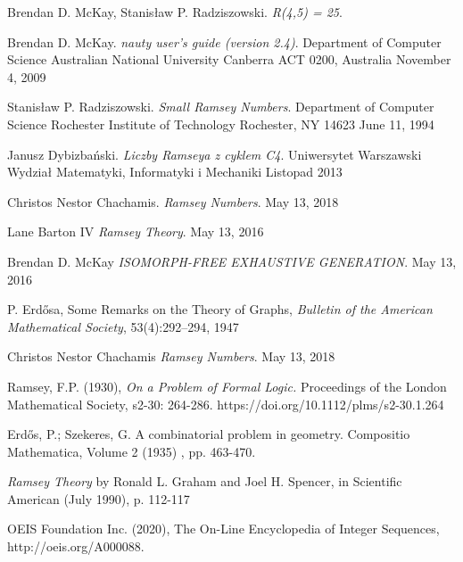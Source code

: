\documentclass[11pt]{article}
\begin{document}
\begin{thebibliography}{9}
  Brendan D. McKay, Stanisław P. Radziszowski. 
  \textit{R(4,5) = 25}. 
  
  Brendan D. McKay.
  \textit{nauty user's guide (version 2.4)}.  
  Department of Computer Science
  Australian National University
  Canberra ACT 0200, Australia
  November 4, 2009

  Stanisław P. Radziszowski.
  \textit{Small Ramsey Numbers}.  
  Department of Computer Science Rochester Institute of Technology Rochester, NY 14623
  June 11, 1994

  Janusz Dybizbański.
  \textit{Liczby Ramseya z cyklem C4}.  
  Uniwersytet Warszawski
  Wydział Matematyki, Informatyki i Mechaniki
  Listopad 2013

  Christos Nestor Chachamis.
  \textit{Ramsey Numbers}.  
  May 13, 2018

  Lane Barton IV
  \textit{Ramsey Theory}.  
  May 13, 2016

  Brendan D. McKay
  \textit{ISOMORPH-FREE EXHAUSTIVE GENERATION}.  
  May 13, 2016
  
  P.  Erdősa,  Some  Remarks  on  the  Theory  of  Graphs,
  \textit{Bulletin  of  the  American  Mathematical  Society},
  53(4):292–294,  1947
  
  Christos Nestor Chachamis
  \textit{Ramsey Numbers}.  
  May 13, 2018

 Ramsey, F.P. (1930), 
 \textit{On a Problem of Formal Logic.}
 Proceedings of the London Mathematical Society, s2-30: 264-286. https://doi.org/10.1112/plms/s2-30.1.264
 
 Erdős, P.; Szekeres, G.
 A combinatorial problem in geometry. Compositio Mathematica, Volume 2 (1935) , pp. 463-470.
  
  \textit{Ramsey Theory}
   by Ronald L. Graham and Joel H. Spencer, in Scientific American (July 1990), p. 112-117
   
       OEIS Foundation Inc. (2020), The On-Line Encyclopedia of Integer Sequences, http://oeis.org/A000088.

  \end{thebibliography}
\end{document}
